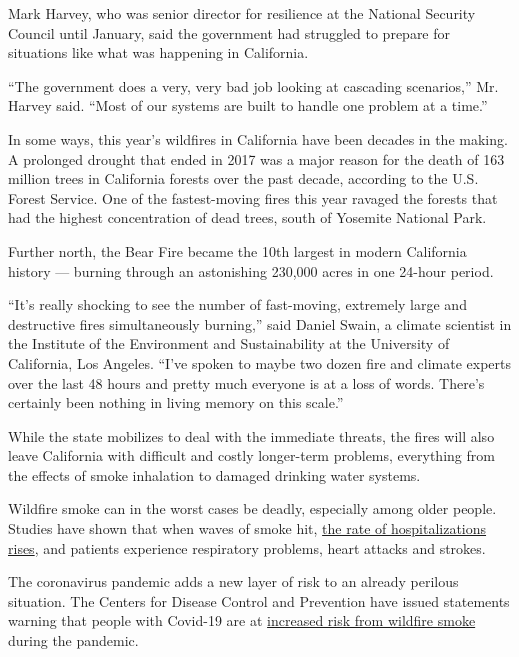Mark Harvey, who was senior director for resilience at the National
Security Council until January, said the government had struggled to
prepare for situations like what was happening in California.

``The government does a very, very bad job looking at cascading
scenarios,'' Mr. Harvey said. ``Most of our systems are built to handle
one problem at a time.''

In some ways, this year's wildfires in California have been decades in
the making. A prolonged drought that ended in 2017 was a major reason
for the death of 163 million trees in California forests over the past
decade, according to the U.S. Forest Service. One of the fastest-moving
fires this year ravaged the forests that had the highest concentration
of dead trees, south of Yosemite National Park.

Further north, the Bear Fire became the 10th largest in modern
California history --- burning through an astonishing 230,000 acres in
one 24-hour period.

``It's really shocking to see the number of fast-moving, extremely large
and destructive fires simultaneously burning,'' said Daniel Swain, a
climate scientist in the Institute of the Environment and Sustainability
at the University of California, Los Angeles. ``I've spoken to maybe two
dozen fire and climate experts over the last 48 hours and pretty much
everyone is at a loss of words. There's certainly been nothing in living
memory on this scale.''

While the state mobilizes to deal with the immediate threats, the fires
will also leave California with difficult and costly longer-term
problems, everything from the effects of smoke inhalation to damaged
drinking water systems.

Wildfire smoke can in the worst cases be deadly, especially among older
people. Studies have shown that when waves of smoke hit,
\href{https://slack-redir.net/link?url=https\%3A\%2F\%2Finsights.ovid.com\%2Fepidemiology\%2Fepide\%2F2017\%2F01\%2F000\%2Fwildfire-specific-fine-particulate-matter-risk\%2F13\%2F00001648}{the
rate of hospitalizations rises}, and patients experience respiratory
problems, heart attacks and strokes.

The coronavirus pandemic adds a new layer of risk to an already perilous
situation. The Centers for Disease Control and Prevention have issued
statements warning that people with Covid-19 are at
\href{https://www.cdc.gov/disasters/covid-19/wildfire_smoke_covid-19.html}{increased
risk from wildfire smoke} during the pandemic.

